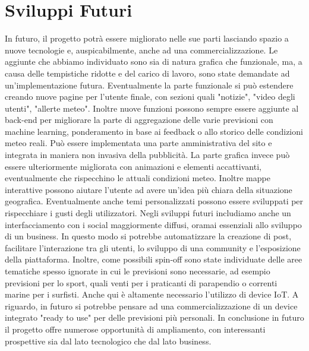     \section{Sviluppi Futuri}
    In futuro, il progetto potrà essere migliorato nelle sue parti lasciando spazio a nuove tecnologie e, auspicabilmente, anche ad una commercializzazione. 
    Le aggiunte che abbiamo individuato sono sia di natura grafica che funzionale, ma, a causa delle tempistiche ridotte e del carico di lavoro, sono state demandate ad un'implementazione futura. \newline
    Eventualmente la parte funzionale si può estendere creando  nuove pagine per l'utente finale, con sezioni quali "notizie", "video degli utenti", "allerte meteo". Inoltre nuove funzioni possono sempre essere aggiunte al back-end per migliorare la parte di aggregazione delle varie previsioni con machine learning, ponderamento in base ai feedback o allo storico delle condizioni meteo reali. Può essere implementata una parte amministrativa del sito e integrata in maniera non invasiva della pubblicità. \newline
    La parte grafica invece può essere ulteriormente migliorata con animazioni e elementi accattivanti, eventualmente che rispecchino le attuali condizioni meteo. Inoltre mappe interattive possono aiutare l'utente ad avere un'idea più chiara della situazione geografica. Eventualmente anche temi personalizzati possono essere sviluppati per rispecchiare i gusti degli utilizzatori.  \newline
    Negli sviluppi futuri includiamo anche un interfacciamento con i social maggiormente diffusi, oramai essenziali allo sviluppo di un business. In questo modo si potrebbe automatizzare la creazione di post, facilitare l'interazione tra gli utenti, lo sviluppo di una community e l'esposizione della piattaforma.  \newline
    Inoltre, come possibili spin-off sono state individuate delle aree tematiche spesso ignorate in cui le previsioni sono necessarie, ad esempio previsioni per lo sport, quali venti per i praticanti di parapendio o correnti marine per i surfisti. Anche qui è altamente necessario l'utilizzo di device IoT.  \newline
    A riguardo, in futuro si potrebbe pensare ad una commercializzazione di un device integrato "ready to use" per delle previsioni più personali.  \newline
    In conclusione in futuro il progetto offre numerose opportunità di ampliamento, con interessanti prospettive sia dal lato tecnologico che dal lato business.  
    
